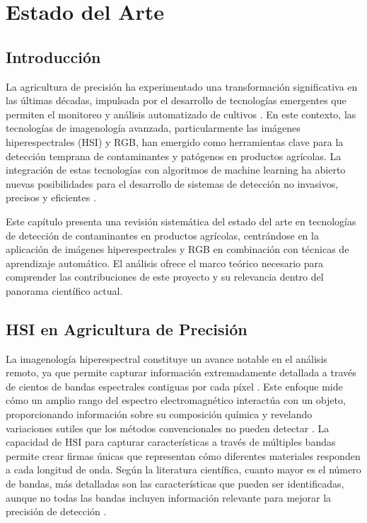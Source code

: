 \chapter{Estado del Arte}

\section{Introducción}

La agricultura de precisión ha experimentado una transformación significativa en las últimas décadas, impulsada por el desarrollo de tecnologías emergentes que permiten el monitoreo y análisis automatizado de cultivos \cite{CISTERNAS2020105626, KHAN2022101678}. En este contexto, las tecnologías de imagenología avanzada, particularmente las imágenes hiperespectrales (HSI) y RGB, han emergido como herramientas clave para la detección temprana de contaminantes y patógenos en productos agrícolas. La integración de estas tecnologías con algoritmos de machine learning ha abierto nuevas posibilidades para el desarrollo de sistemas de detección no invasivos, precisos y eficientes \cite{KHAN2022101678, jimaging5050052, agriengineering6040225}. 
    
Este capítulo presenta una revisión sistemática del estado del arte en tecnologías de detección de contaminantes en productos agrícolas, centrándose en la aplicación de imágenes hiperespectrales y RGB en combinación con técnicas de aprendizaje automático. El análisis ofrece el marco teórico necesario para comprender las contribuciones de este proyecto y su relevancia dentro del panorama científico actual.

\section{HSI en Agricultura de Precisión}

La imagenología hiperespectral constituye un avance notable en el análisis remoto, ya que permite capturar información extremadamente detallada a través de cientos de bandas espectrales contiguas por cada píxel \cite{article}. Este enfoque mide cómo un amplio rango del espectro electromagnético interactúa con un objeto, proporcionando información sobre su composición química y revelando variaciones sutiles que los métodos convencionales no pueden detectar \cite{WIEME2022156}. La capacidad de HSI para capturar características a través de múltiples bandas permite crear firmas únicas que representan cómo diferentes materiales responden a cada longitud de onda. Según la literatura científica, cuanto mayor es el número de bandas, más detalladas son las características que pueden ser identificadas, aunque no todas las bandas incluyen información relevante para mejorar la precisión de detección \cite{HONG201935}.

